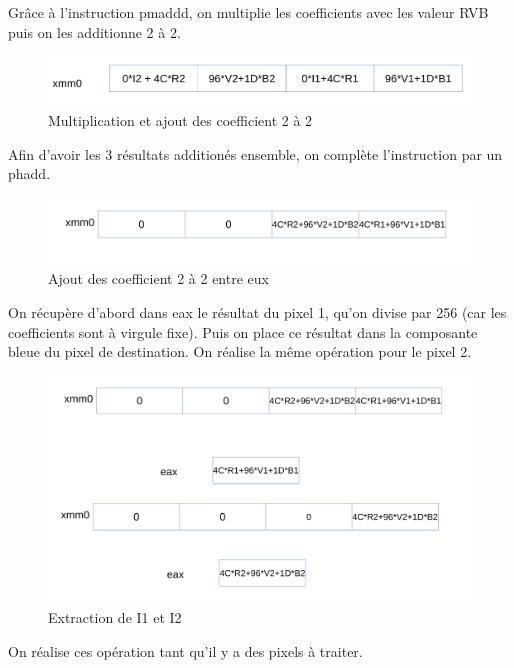 \documentclass[11pt]{report}
\begin{document}
\newpage


Grâce à l'instruction pmaddd, on multiplie les coefficients avec les valeur RVB puis on les additionne 2 à 2.

\begin{figure}[htp]
\centering
\includegraphics[scale=0.20]{pmadd.png}
\caption{Multiplication et ajout des coefficient 2 à 2}
\label{}
\end{figure}

Afin d'avoir les 3 résultats additionés ensemble, on complète l'instruction par un phadd. 
\begin{figure}[htp]
\centering
\includegraphics[scale=0.20]{phadd.png}
\caption{Ajout des coefficient 2 à 2 entre eux}
\label{}
\end{figure}

On récupère d'abord dans eax le résultat du pixel 1, qu'on divise par 256 (car les coefficients sont à virgule fixe). Puis on place ce résultat dans la composante bleue du pixel de destination.
On réalise la même opération pour le pixel 2.

\begin{figure}[htp]
\centering
\includegraphics[scale=0.2]{extraction.png}
\caption{Extraction de I1 et I2}
\label{}
\end{figure}



On réalise ces opération tant qu'il y a des pixels à traiter.
\end{document}
